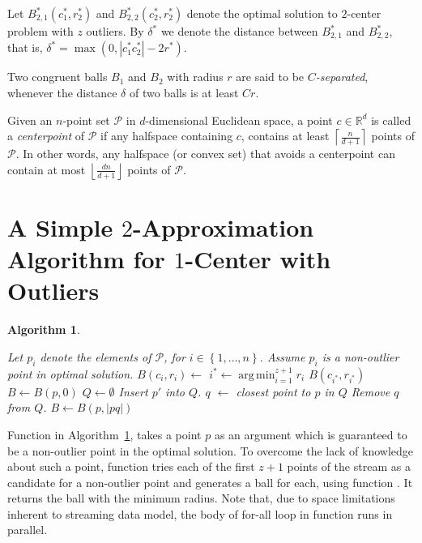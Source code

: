 \documentclass[envcountsame]{cls/cccg15}
\newtheorem{algorithm}{Algorithm}
\DeclareMathOperator*{\argmin}{arg\,min}
\newcommand{\IR}{\ensuremath{\mathbb{R}}}
\newcommand{\set}[1]{\left\{ #1 \right\}}
\newcommand{\ceil}[1]{\left\lceil{#1}\right\rceil}
\newcommand{\floor}[1]{\left\lfloor{#1}\right\rfloor}
\newcommand{\card}[1]{\left|{#1}\right|}
\begin{document}
Let $B_{2,1}^*(c_1^*, r_2^*)$ and $B_{2,2}^*(c_2^*, r_2^*)$ denote the optimal solution to $2$-center problem with $z$ outliers. By $\delta^*$ we denote the distance between $B_{2,1}^*$ and $B_{2,2}^*$, that is, $\delta^* = \max (0, \card{c_1^*c_2^*} - 2r^*)$. 

Two congruent balls $B_1$ and $B_2$ with radius $r$ are said to be \emph{$C$-separated}, whenever the distance $\delta$ of two balls is at least $Cr$.



Given an $n$-point set $\mathcal{P}$ in $d$-dimensional Euclidean space, a point $c \in \IR^d$ is called a \emph{centerpoint} of $\mathcal{P}$ if any halfspace containing $c$, contains at least $\ceil{\frac{n}{d + 1}}$ points of $\mathcal{P}$. In other words, any halfspace (or convex set) that avoids a centerpoint can contain at most $\floor{\frac{dn}{d + 1}}$ points of $\mathcal{P}$.



\section{A Simple $2$-Approximation Algorithm for $1$-Center with Outliers}

\begin{algorithm}
\label{alg:1center}
\leavevmode
\begin{algorithmic}
	\State Let $p_i$ denote the elements of $\mathcal{P}$, for $i \in \set{1, \dots, n}$.
		\State Assume $p_i$ is a non-outlier point in optimal solution.
		\State $B(c_i, r_i) \gets$ 
	\EndFor
	\State $i^* \gets \argmin_{i=1}^{z+1} r_i$
	\State \Return $B(c_{i^*}, r_{i^*})$
\EndFunction
\Statex
{}
	\State $B \gets B(p, 0)$
	\State $Q \gets \emptyset$
			\State Insert $p'$ into $Q$.
			\If{$\card{Q} = z + 1$}
				\State $q$ $\gets$ closest point to $p$ in $Q$
				\State Remove $q$ from $Q$.
				\State $B \gets B(p, \card{pq})$
			\EndIf
		\EndIf
	\EndFor
	\State {}
\EndFunction
\end{algorithmic}
\end{algorithm}
Function  in Algorithm~\ref{alg:1center}, takes a point $p$ as an argument which is guaranteed to be a non-outlier point in the optimal solution. To overcome the lack of knowledge about such a point, function  tries each of the first $z+1$ points of the stream as a candidate for a non-outlier point and generates a ball for each, using function . It returns the ball with the minimum radius. Note that, due to space limitations inherent to streaming data model, the body of for-all loop in function  runs in parallel.
\end{document}
